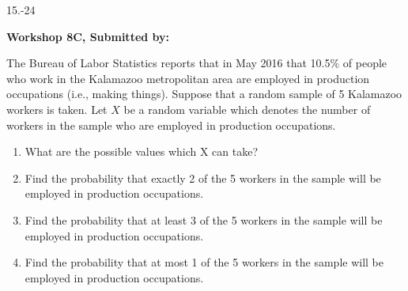 \begin{exsol@exercise}{15.-24}
    \begin{center}
\begin{flushleft}\textbf{\large \hfill Workshop 8C, Submitted by: }\end{flushleft}

\end{center}

The Bureau of Labor Statistics reports that in May 2016 that 10.5\% of people who work in the Kalamazoo metropolitan area are employed in production occupations (i.e., making things). Suppose that a random sample of 5 Kalamazoo workers is taken. Let $X$ be a random variable which denotes the number of workers in the sample who are employed in production occupations.

\begin{enumerate}
  \item What are the possible values which X can take?
  \item Find the probability that exactly 2 of the 5 workers in the sample will be employed in production occupations.
  \item Find the probability that at least 3 of the 5 workers in the sample will be employed in production occupations.
  \item Find the probability that at most 1 of the 5 workers in the sample will be employed in production occupations.
\end{enumerate}

\end{exsol@exercise}
